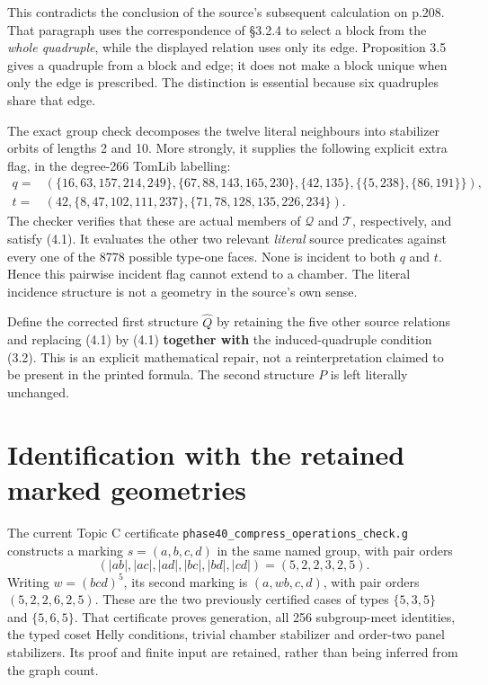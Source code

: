 This contradicts the conclusion of the source's subsequent calculation
on p.208. That paragraph uses the correspondence of §3.2.4 to select a
block from the \emph{whole quadruple}, while the displayed relation uses
only its edge. Proposition 3.5 gives a quadruple from a block and edge;
it does not make a block unique when only the edge is prescribed. The
distinction is essential because six quadruples share that edge.

The exact group check decomposes the twelve literal neighbours into
stabilizer orbits of lengths 2 and 10. More strongly, it supplies the
following explicit extra flag, in the degree-266 TomLib labelling: \[
\begin{aligned}
 q={}&(\{16,63,157,214,249\},\{67,88,143,165,230\},
          \{42,135\},\{\{5,238\},\{86,191\}\}),\\
 t={}&(42,\{8,47,102,111,237\},
          \{71,78,128,135,226,234\}).
\end{aligned}
\] The checker verifies that these are actual members of \(\mathcal Q\)
and \(\mathcal T\), respectively, and satisfy (4.1). It evaluates the
other two relevant \emph{literal} source predicates against every one of
the 8778 possible type-one faces. None is incident to both \(q\) and
\(t\). Hence this pairwise incident flag cannot extend to a chamber. The
literal incidence structure is not a geometry in the source's own sense.

Define the corrected first structure \(\widehat Q\) by retaining the
five other source relations and replacing (4.1) by (4.1)
\textbf{together with} the induced-quadruple condition (3.2). This is an
explicit mathematical repair, not a reinterpretation claimed to be
present in the printed formula. The second structure \(P\) is left
literally unchanged.

\section{Identification with the retained marked
geometries}\label{identification-with-the-retained-marked-geometries}

The current Topic C certificate \texttt{phase40\_compress\_operations\_check.g}
constructs a marking \(s=(a,b,c,d)\) in the same named group, with pair
orders \[
 (|ab|,|ac|,|ad|,|bc|,|bd|,|cd|)=(5,2,2,3,2,5).
\] Writing \(w=(bcd)^5\), its second marking is \((a,wb,c,d)\), with
pair orders \((5,2,2,6,2,5)\). These are the two previously certified
cases of types \(\{5,3,5\}\) and \(\{5,6,5\}\). That certificate proves
generation, all 256 subgroup-meet identities, the typed coset Helly
conditions, trivial chamber stabilizer and order-two panel stabilizers.
Its proof and finite input are retained, rather than being inferred from
the graph count.

